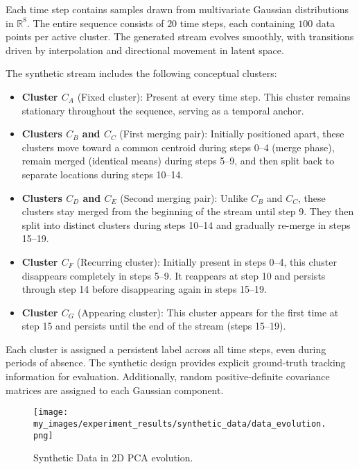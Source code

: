 Each time step contains samples drawn from multivariate Gaussian distributions
in $\mathbb{R}^8$. The entire sequence consists of $20$ time steps, each
containing $100$ data points per active cluster. The generated stream evolves
smoothly, with transitions driven by interpolation and directional movement in
latent space.

The synthetic stream includes the following conceptual clusters:

\begin{itemize}
      \item \textbf{Cluster $ C_A $} (Fixed cluster): Present at every time step.
            This cluster remains stationary throughout the sequence, serving as a
            temporal anchor.

      \item \textbf{Clusters $ C_B $ and $ C_C $} (First merging pair): Initially
            positioned apart, these clusters move toward a common centroid during steps 0--4
            (merge phase), remain merged (identical means) during steps 5--9, and then split
            back to separate locations during steps 10--14.

      \item \textbf{Clusters $ C_D $ and $ C_E $} (Second merging pair): Unlike $ C_B $
            and $ C_C $, these clusters stay merged from the beginning of the stream until
            step 9. They then split into distinct clusters during steps 10--14 and gradually
            re-merge in steps 15--19.

      \item \textbf{Cluster $ C_F $} (Recurring cluster): Initially present in steps 0--4,
            this cluster disappears completely in steps 5--9. It reappears at step 10 and
            persists through step 14 before disappearing again in steps 15--19.

      \item \textbf{Cluster $ C_G $} (Appearing cluster): This cluster appears for
            the first time at step 15 and persists until the end of the stream (steps 15--19).
\end{itemize}

Each cluster is assigned a persistent label across all time steps, even during
periods of absence. The synthetic design provides explicit ground-truth
tracking information for evaluation. Additionally, random positive-definite
covariance matrices are assigned to each Gaussian component.

\begin{figure}[H]
      \centering
      \texttt{[image: my\_images/experiment\_results/synthetic\_data/data\_evolution.png]}
      \caption{Synthetic Data in 2D PCA evolution.}
\end{figure}

